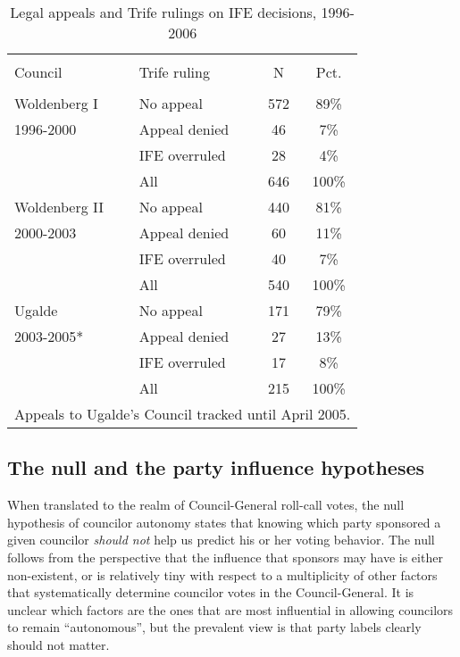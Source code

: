 \documentclass[12 pt, letter]{article}
\begin{document}
\begin{table}
\caption{Legal appeals and {\sc Trife} rulings on IFE decisions, 1996-2006}\label{T:rulings}
\begin{center}
\begin{tabular}{llcc}
\hline\\ [-1.5ex]
Council & {\sc Trife} ruling &  N  & Pct. \\
\hline \\ [-1ex]
Woldenberg I & No appeal  & 572 &  89\% \\
1996-2000 & Appeal denied &  46 &   7\% \\
          & IFE overruled &  28 &   4\% \\
          & All           & 646 & 100\% \\ [1.2ex]
Woldenberg II & No appeal & 440 &  81\% \\
2000-2003 & Appeal denied &  60 &  11\% \\
          & IFE overruled &  40 &   7\% \\
          & All           & 540 & 100\% \\ [1.2ex]
Ugalde    & No appeal     & 171 &  79\% \\
2003-2005* & Appeal denied &  27 &  13\% \\
          & IFE overruled &  17 &   8\% \\
          & All           & 215 & 100\% \\
\hline \multicolumn{4}{l}{\small * Appeals to Ugalde's Council
tracked until April 2005.}
\end{tabular}
\end{center}
\end{table}


\subsection{The null and the party influence hypotheses}
When translated to the realm of Council-General roll-call votes, the
null hypothesis of councilor autonomy states that knowing which
party sponsored a given councilor \emph{should not} help us predict
his or her voting behavior. The null follows from the perspective
that the influence that sponsors may have is either non-existent, or
is relatively tiny with respect to a multiplicity of other factors
that systematically determine councilor votes in the
Council-General. It is unclear which  factors are the ones that are
most influential in allowing  councilors to remain ``autonomous'',
but the prevalent view is that party labels clearly should not
matter.
\end{document}
